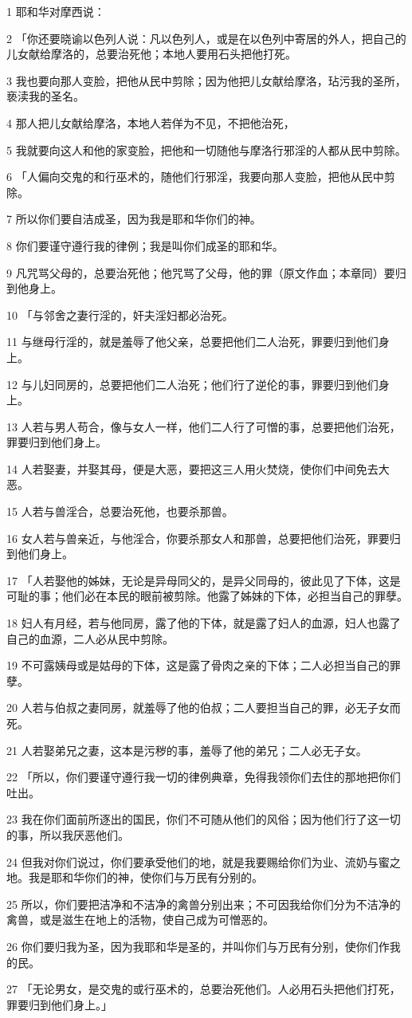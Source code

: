 \par 1 耶和华对摩西说：
\par 2 「你还要晓谕以色列人说：凡以色列人，或是在以色列中寄居的外人，把自己的儿女献给摩洛的，总要治死他；本地人要用石头把他打死。
\par 3 我也要向那人变脸，把他从民中剪除；因为他把儿女献给摩洛，玷污我的圣所，亵渎我的圣名。
\par 4 那人把儿女献给摩洛，本地人若佯为不见，不把他治死，
\par 5 我就要向这人和他的家变脸，把他和一切随他与摩洛行邪淫的人都从民中剪除。
\par 6 「人偏向交鬼的和行巫术的，随他们行邪淫，我要向那人变脸，把他从民中剪除。
\par 7 所以你们要自洁成圣，因为我是耶和华你们的神。
\par 8 你们要谨守遵行我的律例；我是叫你们成圣的耶和华。
\par 9 凡咒骂父母的，总要治死他；他咒骂了父母，他的罪（原文作血；本章同）要归到他身上。
\par 10 「与邻舍之妻行淫的，奸夫淫妇都必治死。
\par 11 与继母行淫的，就是羞辱了他父亲，总要把他们二人治死，罪要归到他们身上。
\par 12 与儿妇同房的，总要把他们二人治死；他们行了逆伦的事，罪要归到他们身上。
\par 13 人若与男人苟合，像与女人一样，他们二人行了可憎的事，总要把他们治死，罪要归到他们身上。
\par 14 人若娶妻，并娶其母，便是大恶，要把这三人用火焚烧，使你们中间免去大恶。
\par 15 人若与兽淫合，总要治死他，也要杀那兽。
\par 16 女人若与兽亲近，与他淫合，你要杀那女人和那兽，总要把他们治死，罪要归到他们身上。
\par 17 「人若娶他的姊妹，无论是异母同父的，是异父同母的，彼此见了下体，这是可耻的事；他们必在本民的眼前被剪除。他露了姊妹的下体，必担当自己的罪孽。
\par 18 妇人有月经，若与他同房，露了他的下体，就是露了妇人的血源，妇人也露了自己的血源，二人必从民中剪除。
\par 19 不可露姨母或是姑母的下体，这是露了骨肉之亲的下体；二人必担当自己的罪孽。
\par 20 人若与伯叔之妻同房，就羞辱了他的伯叔；二人要担当自己的罪，必无子女而死。
\par 21 人若娶弟兄之妻，这本是污秽的事，羞辱了他的弟兄；二人必无子女。
\par 22 「所以，你们要谨守遵行我一切的律例典章，免得我领你们去住的那地把你们吐出。
\par 23 我在你们面前所逐出的国民，你们不可随从他们的风俗；因为他们行了这一切的事，所以我厌恶他们。
\par 24 但我对你们说过，你们要承受他们的地，就是我要赐给你们为业、流奶与蜜之地。我是耶和华你们的神，使你们与万民有分别的。
\par 25 所以，你们要把洁净和不洁净的禽兽分别出来；不可因我给你们分为不洁净的禽兽，或是滋生在地上的活物，使自己成为可憎恶的。
\par 26 你们要归我为圣，因为我耶和华是圣的，并叫你们与万民有分别，使你们作我的民。
\par 27 「无论男女，是交鬼的或行巫术的，总要治死他们。人必用石头把他们打死，罪要归到他们身上。」

